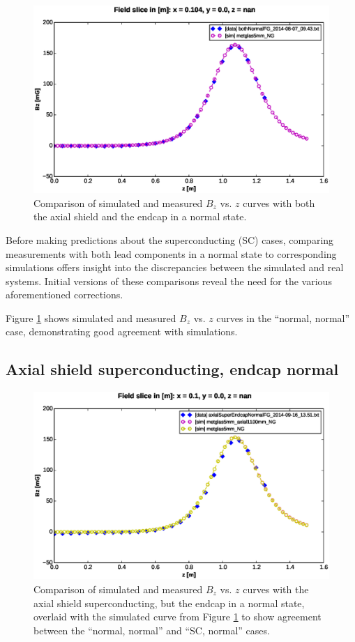 \documentclass[twocolumn,aps,prb,citeautoscript]{revtex4-1}
\begin{document}
\begin{figure}
    \includegraphics[width=\textwidth]{figures/normnorm_comp.eps}
    \caption{\label{fig:normnorm_comp}Comparison of simulated and measured $B_z$ vs. $z$ curves with
    both the axial shield and the endcap in a normal state.}
\end{figure}

Before making predictions about the superconducting (SC) cases, comparing measurements with both lead components in
a normal state to corresponding simulations offers insight into the discrepancies between the simulated and real
systems. Initial versions of these comparisons reveal the need for the various aforementioned corrections.

Figure \ref{fig:normnorm_comp} shows simulated and measured $B_z$ vs. $z$ curves in the ``normal, normal'' case,
demonstrating good agreement with simulations.

\subsection{Axial shield superconducting, endcap normal}

\begin{figure}
    \includegraphics[width=\textwidth]{figures/SCnorm_comp_new.eps}
    \caption{\label{fig:SCnorm_comp}Comparison of simulated and measured $B_z$ vs. $z$ curves with the
    axial shield superconducting, but the endcap in a normal state, overlaid with the simulated
    curve from Figure
     \ref{fig:normnorm_comp} to show agreement between the ``normal, normal'' and ``SC, normal'' cases.}
\end{figure}
\end{document}
